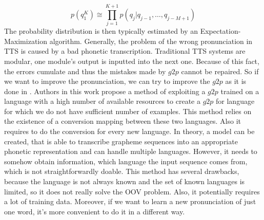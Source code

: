 \begin{equation}
p(q_1^K) \cong \prod_{j=1}^{K+1} p(q_j\vert q_{j-1},\dots,q_{j-M+1})
\end{equation}
The probability distribution is then typically estimated by an Expectation-Maximization algorithm.
\linebreak \linebreak
Generally, the problem of the wrong pronunciation in TTS  is caused by a bad phonetic transcription.
Traditional TTS systems are modular, one module's output is inputted into the next one.
Because of this fact, the errors cumulate and thus the mistakes made by $g2p$ cannot be repaired.
So if we want to improve the pronunciation, we can try to improve the $g2p$ as it is done in \cite{deri2016grapheme}.
Authors in this work propose a method of exploiting a $g2p$ trained on a language with a high number of available resources to create a $g2p$ for language for which we do not have sufficient number of examples.
This method relies on the existence of a conversion mapping between these two languages.
Also it requires to do the conversion for every new language.
In theory, a model can be created, that is able to transcribe grapheme sequences into an appropriate phonetic representation and can handle multiple languages.
However, it needs to somehow obtain information, which language the input sequence comes from, which is not straightforwardly doable.
This method has several drawbacks, because the language is not always known and the set of known languages is limited, so it does not really solve the OOV problem.
Also, it potentially requires a lot of training data.
Moreover, if we want to learn a new pronunciation of just one word, it's more convenient to do it in a different way.
